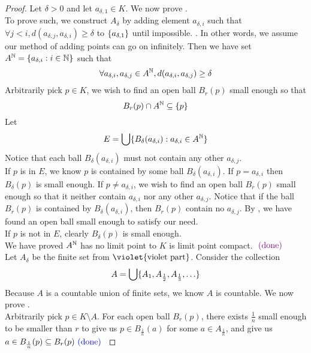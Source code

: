 \documentclass{report}
\begin{document}
\begin{proof}
Let $\delta>0$ and let $a_{\delta, 1}\in K$. We now prove .\\

To prove such, we construct $A_\delta$ by adding element $a_{\delta,i}$ such that $\forall j<i, d(a_{\delta, j},a_{\delta ,i})\geq \delta$ to $\{ a_{\delta ,1} \}$ until impossible. . In other words, we assume our method of adding points can go on infinitely. Then we have set $A^{\mathbb{N}}=\{ a_{\delta,i}:i\in\mathbb{N} \}$ such that
\begin{equation}
\forall a_{\delta,i},a_{\delta,j}\in A^{\mathbb{N}}, d(a_{\delta, i},a_{\delta , j})\geq \delta
\end{equation}
Arbitrarily pick $p\in  K$, we wish to find an open ball $B_r(p)$ small enough so that
\begin{equation}
B_r(p)\cap A^{\mathbb{N}}\subseteq \{ p \}
\end{equation}
Let
\begin{equation}
E=\bigcup \{ B_\delta(a_{\delta,i}):a_{\delta,i}\in A^{\mathbb{N}} \}
\end{equation}
Notice that each ball $B_{\delta}(a_{\delta,i})$ must not contain any other $a_{\delta,j}$.\\

If $p$ is in $E$, we know $p$ is contained by some ball  $B_{\delta}(a_{\delta,i})$. If $p=a_{\delta,i}$  then $B_{\delta}(p)$ is small enough. If $p\neq a_{\delta,i}$, we wish to find an open ball $B_r(p)$ small enough so that it neither contain $a_{\delta,i}$ nor any other $a_{\delta,j}$. Notice that if the ball $B_r(p)$ is contained by $B_\delta(a_{\delta,i})$, then $B_r(p)$ contain no $a_{\delta,j}$. By , we have found an open ball small enough to satisfy our need.\\

If $p$ is not in $E$, clearly $B_{\delta}(p)$ is small enough.\\

We have proved $A^{\mathbb{N}}$ has no limit point \CaC to $K$ is limit point compact. $\textcolor{violet}{\text{ (done) }}$\\

Let $A_\delta$ be the finite set from $\violet{\text{violet part}}$. Consider the collection 
\begin{equation}
A=\bigcup \set{A_1,A_{\frac{1}{2}},A_{\frac{1}{3}},\dots}
\end{equation}
Because $A$ is a countable union of finite sets, we know $A$ is countable. We now prove .\\


Arbitrarily pick $p\in K\setminus A$. For each open ball $B_r(p)$, there exists $\frac{1}{n}$ small enough to be smaller than $r$ to give us $p\in B_{\frac{1}{n}}(a)$ for some $a\in A_{\frac{1}{n}}$, and give us $a\in B_{\frac{1}{n}}(p)\subseteq B_r(p)\textcolor{blue}{\text{ (done) }}$
\end{proof}
\end{document}
